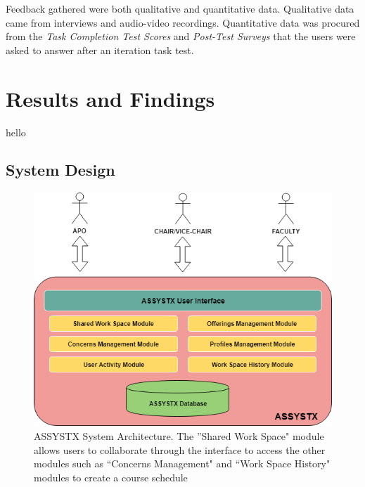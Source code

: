 Feedback gathered were both qualitative and quantitative data. Qualitative data came from interviews and audio-video recordings. Quantitative data was procured from the \textit{Task Completion Test Scores} and \textit{Post-Test Surveys} that the users were asked to answer after an iteration task test. 




\section{Results and Findings}
hello
\subsection{System Design}

\begin{figure}[h]
   \centering
   \includegraphics[scale=0.4]{Diagrams/System_Architecture.png}
   \caption{ASSYSTX System Architecture. The ''Shared Work Space" module allows users to collaborate through the interface to access the other modules such as ``Concerns Management" and ``Work Space History" modules to create a course schedule}
    \label{fig:pipelinediagram}
\end{figure}

